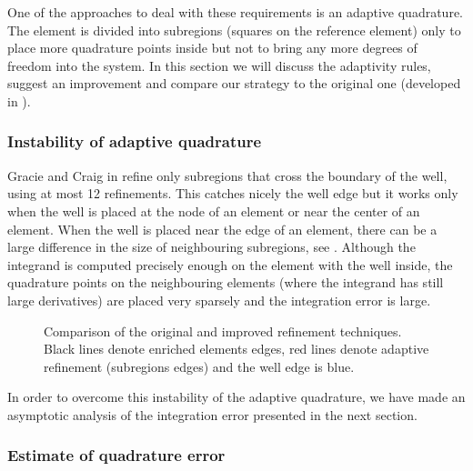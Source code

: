 One of the approaches to deal with these requirements is an adaptive quadrature. The element is divided into 
subregions (squares on the reference element) only to place more quadrature points inside but not to bring 
any more degrees of freedom into the system. In this section we will discuss the adaptivity rules, 
suggest an improvement and compare our strategy to the original one (developed in \cite{gracie_modelling_2010}).

\subsubsection{Instability of adaptive quadrature}
\label{sec:refinement_element}
Gracie and Craig in \cite{gracie_modelling_2010} refine only subregions that cross the boundary of the well, using at most 12 refinements.
This catches nicely the well edge but it works only when the well is placed at the node of an element or near the center of an element. 
When the well is placed near the edge of an element, there can be
a large difference in the size of neighbouring subregions, see . Although
the integrand is computed precisely enough on the element with the well inside, the quadrature points on the
neighbouring elements (where the integrand has still large derivatives) are placed very sparsely 
and the integration error is large.

\begin{figure}[!htb]
  \centering    
  \hspace{0pt}
  \caption[Adaptive refinement comparison]
  {Comparison of the original and improved refinement techniques.
   Black lines denote enriched elements edges, red lines denote adaptive refinement (subregions edges) and the well
   edge is blue.
  }
  \label{fig:adapt_refinement}
\end{figure}
In order to overcome this instability of the adaptive quadrature, we have made an asymptotic analysis of the integration error presented 
in the next section.

\subsubsection{Estimate of quadrature error}

